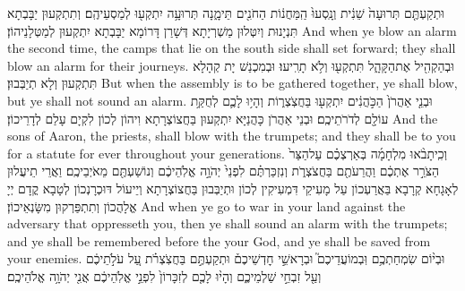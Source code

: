 {וּתְקַעְתֶּ֤ם תְּרוּעָה֙ שֵׁנִ֔ית וְנָֽסְעוּ֙ הַֽמַּחֲנ֔וֹת הַחֹנִ֖ים תֵּימָ֑נָה תְּרוּעָ֥ה יִתְקְע֖וּ לְמַסְעֵיהֶֽם׃}
{וְתִתְקְעוּן יַבָּבְתָא תִּנְיָנוּת וְיִטְּלוּן מַשְׁרְיָתָא דְּשָׁרַן דָּרוֹמָא יַבָּבְתָא יִתְקְעוּן לְמַטְּלָנֵיהוֹן׃}
{And when ye blow an alarm the second time, the camps that lie on the south side shall set forward; they shall blow an alarm for their journeys.}{}
{וּבְהַקְהִ֖יל אֶת\maqqaf הַקָּהָ֑ל תִּתְקְע֖וּ וְלֹ֥א תָרִֽיעוּ׃}
{וּבְמִכְנַשׁ יָת קְהָלָא תִּתְקְעוּן וְלָא תְיַבְּבוּן׃}
{But when the assembly is to be gathered together, ye shall blow, but ye shall not sound an alarm.}{}
{וּבְנֵ֤י אַהֲרֹן֙ הַכֹּ֣הֲנִ֔ים יִתְקְע֖וּ בַּחֲצֹֽצְר֑וֹת וְהָי֥וּ לָכֶ֛ם לְחֻקַּ֥ת עוֹלָ֖ם לְדֹרֹתֵיכֶֽם׃}
{וּבְנֵי אַהֲרֹן כָּהֲנַיָּא יִתְקְעוּן בַּחֲצוֹצְרָתָא וִיהוֹן לְכוֹן לִקְיָם עָלַם לְדָרֵיכוֹן׃}
{And the sons of Aaron, the priests, shall blow with the trumpets; and they shall be to you for a statute for ever throughout your generations.}{}
{וְכִֽי\maqqaf תָבֹ֨אוּ מִלְחָמָ֜ה בְּאַרְצְכֶ֗ם עַל\maqqaf הַצַּר֙ הַצֹּרֵ֣ר אֶתְכֶ֔ם וַהֲרֵעֹתֶ֖ם בַּחֲצֹצְרֹ֑ת וְנִזְכַּרְתֶּ֗ם לִפְנֵי֙ יְהֹוָ֣ה אֱלֹֽהֵיכֶ֔ם וְנוֹשַׁעְתֶּ֖ם מֵאֹיְבֵיכֶֽם׃}
{וַאֲרֵי תֵיעֲלוּן לְאָגָחָא קְרָבָא בַּאֲרַעְכוֹן עַל מָעִיקֵי דִּמְעִיקִין לְכוֹן וּתְיַבְּבוּן בַּחֲצוֹצְרָתָא וְיֵיעוֹל דּוּכְרָנְכוֹן לְטָבָא קֳדָם יְיָ אֱלָהֲכוֹן וְתִתְפַּרְקוּן מִשָּׂנְאֵיכוֹן׃}
{And when ye go to war in your land against the adversary that oppresseth you, then ye shall sound an alarm with the trumpets; and ye shall be remembered before the \lord\space your God, and ye shall be saved from your enemies.}{}
{וּבְי֨וֹם שִׂמְחַתְכֶ֥ם וּֽבְמוֹעֲדֵיכֶם֮ וּבְרָאשֵׁ֣י חׇדְשֵׁיכֶם֒ וּתְקַעְתֶּ֣ם בַּחֲצֹֽצְרֹ֗ת עַ֚ל עֹלֹ֣תֵיכֶ֔ם וְעַ֖ל זִבְחֵ֣י שַׁלְמֵיכֶ֑ם וְהָי֨וּ לָכֶ֤ם לְזִכָּרוֹן֙ לִפְנֵ֣י אֱלֹֽהֵיכֶ֔ם אֲנִ֖י יְהֹוָ֥ה אֱלֹהֵיכֶֽם׃ \petucha }
